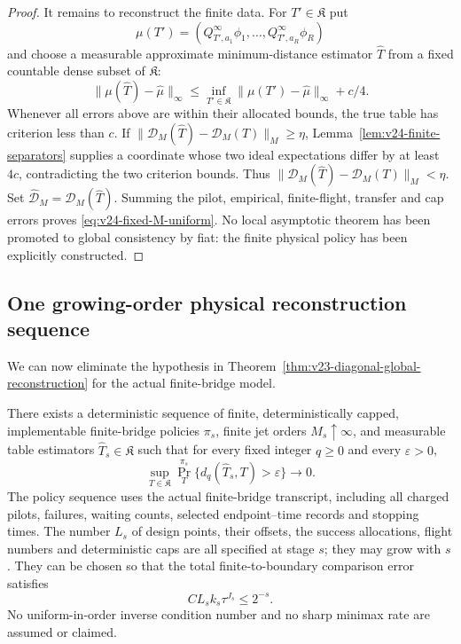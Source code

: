 \begin{proof}
It remains to reconstruct the finite data.  For \(T'\in\mathfrak K\) put
\[
 \mu(T')=(Q_{T',a_1}^{\infty}\phi_1,\ldots,
          Q_{T',a_R}^{\infty}\phi_R)
\]
and choose a measurable approximate minimum-distance estimator
\(\widehat T\) from a fixed countable dense subset of \(\mathfrak K\):
\[
 \|\mu(\widehat T)-\widehat\mu\|_\infty
 \le\inf_{T'\in\mathfrak K}
       \|\mu(T')-\widehat\mu\|_\infty+c/4.
\]
Whenever all errors above are within their allocated bounds, the true table
has criterion less than \(c\).  If
\(\|\mathcal D_M(\widehat T)-\mathcal D_M(T)\|_M\ge\eta\),
Lemma~\ref{lem:v24-finite-separators} supplies a coordinate whose two ideal
expectations differ by at least \(4c\), contradicting the two criterion
bounds.  Thus
\(\|\mathcal D_M(\widehat T)-\mathcal D_M(T)\|_M<\eta\).
Set \(\widehat{\mathcal D}_M=\mathcal D_M(\widehat T)\).  Summing the pilot,
empirical, finite-flight, transfer and cap errors proves
\eqref{eq:v24-fixed-M-uniform}.  No local asymptotic theorem has been promoted
to global consistency by fiat: the finite physical policy has been explicitly
constructed.
\end{proof}

\subsection{One growing-order physical reconstruction sequence}

We can now eliminate the hypothesis in
Theorem~\ref{thm:v23-diagonal-global-reconstruction} for the actual
finite-bridge model.

\begin{theorem}
\label{thm:v24-physical-global-reconstruction}
There exists a deterministic sequence of finite, deterministically capped,
implementable finite-bridge policies \(\pi_s\), finite jet orders
\(M_s\uparrow\infty\), and measurable table estimators
\(\widehat T_s\in\mathfrak K\) such that for every fixed integer \(q\ge0\)
and every \(\varepsilon>0\),
\begin{equation}\label{eq:v24-physical-global-consistency}
 \sup_{T\in\mathfrak K}
 \Pr_T^{\pi_s}\{d_q(\widehat T_s,T)>\varepsilon\}
 \longrightarrow0.
\end{equation}
The policy sequence uses the actual finite-bridge transcript, including all
charged pilots, failures, waiting counts, selected endpoint--time records and
stopping times.  The number \(L_s\) of design points, their offsets, the
success allocations, flight numbers and deterministic caps are all specified
at stage \(s\); they may grow with \(s\).  They can be chosen so that the total
finite-to-boundary comparison error satisfies
\begin{equation}\label{eq:v24-growing-transfer}
                         C L_s k_s\tau^{J_s}\le2^{-s}.
\end{equation}
No uniform-in-order inverse condition number and no sharp minimax rate are
assumed or claimed.
\end{theorem}

